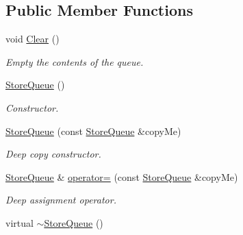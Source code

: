 \subsection*{Public Member Functions}
\begin{DoxyCompactItemize}
\item 
\hypertarget{class_store_queue_a195dbfce72c03cf2fb1d43ad4c613574}{
void \hyperlink{class_store_queue_a195dbfce72c03cf2fb1d43ad4c613574}{Clear} ()}
\label{class_store_queue_a195dbfce72c03cf2fb1d43ad4c613574}

\begin{DoxyCompactList}\small\item\em Empty the contents of the queue. \item\end{DoxyCompactList}\item 
\hypertarget{class_store_queue_a339e1cbdda8aa75d7a92e313bffec4ba}{
\hyperlink{class_store_queue_a339e1cbdda8aa75d7a92e313bffec4ba}{StoreQueue} ()}
\label{class_store_queue_a339e1cbdda8aa75d7a92e313bffec4ba}

\begin{DoxyCompactList}\small\item\em Constructor. \item\end{DoxyCompactList}\item 
\hyperlink{class_store_queue_a7a98b8bdec40b04616061f8368191a6d}{StoreQueue} (const \hyperlink{class_store_queue}{StoreQueue} \&copyMe)
\begin{DoxyCompactList}\small\item\em Deep copy constructor. \item\end{DoxyCompactList}\item 
\hyperlink{class_store_queue}{StoreQueue} \& \hyperlink{class_store_queue_adb3eac91f8e6105c6b4d710e5dea56c4}{operator=} (const \hyperlink{class_store_queue}{StoreQueue} \&copyMe)
\begin{DoxyCompactList}\small\item\em Deep assignment operator. \item\end{DoxyCompactList}\item 
\hypertarget{class_store_queue_ab305c9a2f7c9477f4fa75cb2c8d3a723}{
virtual \hyperlink{class_store_queue_ab305c9a2f7c9477f4fa75cb2c8d3a723}{$\sim$StoreQueue} ()}
\label{class_store_queue_ab305c9a2f7c9477f4fa75cb2c8d3a723}


\end{DoxyCompactItemize}
